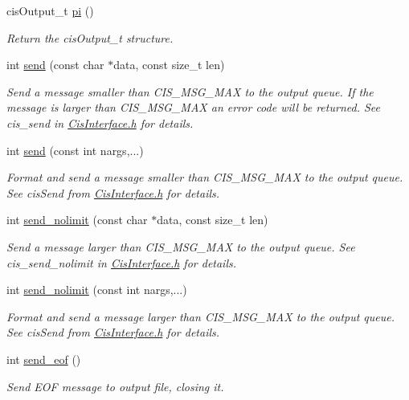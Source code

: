 \begin{DoxyCompactItemize}
cis\+Output\+\_\+t \mbox{\hyperlink{classCisOutput_a173ffd20bb1ce255ba95562caa220d6a}{pi}} ()
\begin{DoxyCompactList}\small\item\em Return the cis\+Output\+\_\+t structure. \end{DoxyCompactList}\item 
int \mbox{\hyperlink{classCisOutput_a38322e95e9743e4b5b5d4c529d13031e}{send}} (const char $\ast$data, const size\+\_\+t len)
\begin{DoxyCompactList}\small\item\em Send a message smaller than C\+I\+S\+\_\+\+M\+S\+G\+\_\+\+M\+AX to the output queue. If the message is larger than C\+I\+S\+\_\+\+M\+S\+G\+\_\+\+M\+AX an error code will be returned. See cis\+\_\+send in \mbox{\hyperlink{CisInterface_8h_source}{Cis\+Interface.\+h}} for details. \end{DoxyCompactList}\item 
int \mbox{\hyperlink{classCisOutput_ad30d4a8e64e7a9b7033cddf4a3aef9de}{send}} (const int nargs,...)
\begin{DoxyCompactList}\small\item\em Format and send a message smaller than C\+I\+S\+\_\+\+M\+S\+G\+\_\+\+M\+AX to the output queue. See cis\+Send from \mbox{\hyperlink{CisInterface_8h_source}{Cis\+Interface.\+h}} for details. \end{DoxyCompactList}\item 
int \mbox{\hyperlink{classCisOutput_a794b0e4d24de72339faab690554db4d3}{send\+\_\+nolimit}} (const char $\ast$data, const size\+\_\+t len)
\begin{DoxyCompactList}\small\item\em Send a message larger than C\+I\+S\+\_\+\+M\+S\+G\+\_\+\+M\+AX to the output queue. See cis\+\_\+send\+\_\+nolimit in \mbox{\hyperlink{CisInterface_8h_source}{Cis\+Interface.\+h}} for details. \end{DoxyCompactList}\item 
int \mbox{\hyperlink{classCisOutput_a5b7e84b70352f3a5f99650184a076564}{send\+\_\+nolimit}} (const int nargs,...)
\begin{DoxyCompactList}\small\item\em Format and send a message larger than C\+I\+S\+\_\+\+M\+S\+G\+\_\+\+M\+AX to the output queue. See cis\+Send from \mbox{\hyperlink{CisInterface_8h_source}{Cis\+Interface.\+h}} for details. \end{DoxyCompactList}\item 
int \mbox{\hyperlink{classCisOutput_a083fb17afbb3c03f103929850506e545}{send\+\_\+eof}} ()
\begin{DoxyCompactList}\small\item\em Send E\+OF message to output file, closing it. \end{DoxyCompactList}\end{DoxyCompactItemize}


